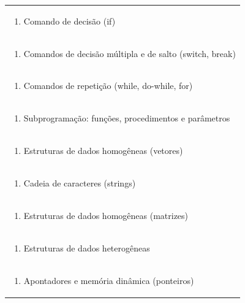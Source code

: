 \documentclass[11pt]{article}
\begin{document}
\begin{center}
\begin{longtable}{|p{4cm}|p{4cm}|p{4cm}|p{4cm}|}
\multicolumn{4}{|p{\dimexpr 16cm + 6\tabcolsep\relax}|}{\begin{enumerate}[start=7]\item Comando de decisão (if)\end{enumerate}}\\
\multicolumn{4}{|p{\dimexpr 16cm + 6\tabcolsep\relax}|}{\begin{enumerate}[start=8]\item Comandos de decisão múltipla e de salto (switch, break)\end{enumerate}}\\
\multicolumn{4}{|p{\dimexpr 16cm + 6\tabcolsep\relax}|}{\begin{enumerate}[start=9]\item Comandos de repetição (while, do-while, for)\end{enumerate}}\\
\multicolumn{4}{|p{\dimexpr 16cm + 6\tabcolsep\relax}|}{\begin{enumerate}[start=10]\item Subprogramação: funções, procedimentos e parâmetros\end{enumerate}}\\
\multicolumn{4}{|p{\dimexpr 16cm + 6\tabcolsep\relax}|}{\begin{enumerate}[start=11]\item Estruturas de dados homogêneas (vetores)\end{enumerate}}\\
\multicolumn{4}{|p{\dimexpr 16cm + 6\tabcolsep\relax}|}{\begin{enumerate}[start=12]\item Cadeia de caracteres (strings)\end{enumerate}}\\
\multicolumn{4}{|p{\dimexpr 16cm + 6\tabcolsep\relax}|}{\begin{enumerate}[start=13]\item Estruturas de dados homogêneas (matrizes)\end{enumerate}}\\
\multicolumn{4}{|p{\dimexpr 16cm + 6\tabcolsep\relax}|}{\begin{enumerate}[start=14]\item Estruturas de dados heterogêneas\end{enumerate}}\\
\multicolumn{4}{|p{\dimexpr 16cm + 6\tabcolsep\relax}|}{\begin{enumerate}[start=15]\item Apontadores e memória dinâmica (ponteiros)\end{enumerate}}\\

\end{longtable}
\end{center}
\end{document}
